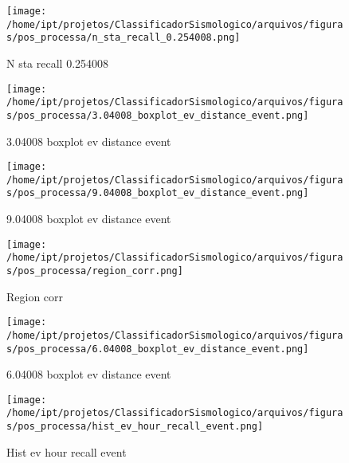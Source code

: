     \begin{figure}[H]
        \centering
        \texttt{[image: /home/ipt/projetos/ClassificadorSismologico/arquivos/figuras/pos\_processa/n\_sta\_recall\_0.254008.png]}
        \caption{N sta recall 0.254008}
        \label{fig:n_sta_recall_0.254008}
    \end{figure}
                

    \begin{figure}[H]
        \centering
        \texttt{[image: /home/ipt/projetos/ClassificadorSismologico/arquivos/figuras/pos\_processa/3.04008\_boxplot\_ev\_distance\_event.png]}
        \caption{3.04008 boxplot ev distance event}
        \label{fig:3.04008_boxplot_ev_distance_event}
    \end{figure}
                

    \begin{figure}[H]
        \centering
        \texttt{[image: /home/ipt/projetos/ClassificadorSismologico/arquivos/figuras/pos\_processa/9.04008\_boxplot\_ev\_distance\_event.png]}
        \caption{9.04008 boxplot ev distance event}
        \label{fig:9.04008_boxplot_ev_distance_event}
    \end{figure}
                

    \begin{figure}[H]
        \centering
        \texttt{[image: /home/ipt/projetos/ClassificadorSismologico/arquivos/figuras/pos\_processa/region\_corr.png]}
        \caption{Region corr}
        \label{fig:region_corr}
    \end{figure}
                

    \begin{figure}[H]
        \centering
        \texttt{[image: /home/ipt/projetos/ClassificadorSismologico/arquivos/figuras/pos\_processa/6.04008\_boxplot\_ev\_distance\_event.png]}
        \caption{6.04008 boxplot ev distance event}
        \label{fig:6.04008_boxplot_ev_distance_event}
    \end{figure}
                

    \begin{figure}[H]
        \centering
        \texttt{[image: /home/ipt/projetos/ClassificadorSismologico/arquivos/figuras/pos\_processa/hist\_ev\_hour\_recall\_event.png]}
        \caption{Hist ev hour recall event}
        \label{fig:hist_ev_hour_recall_event}
    \end{figure}
                

